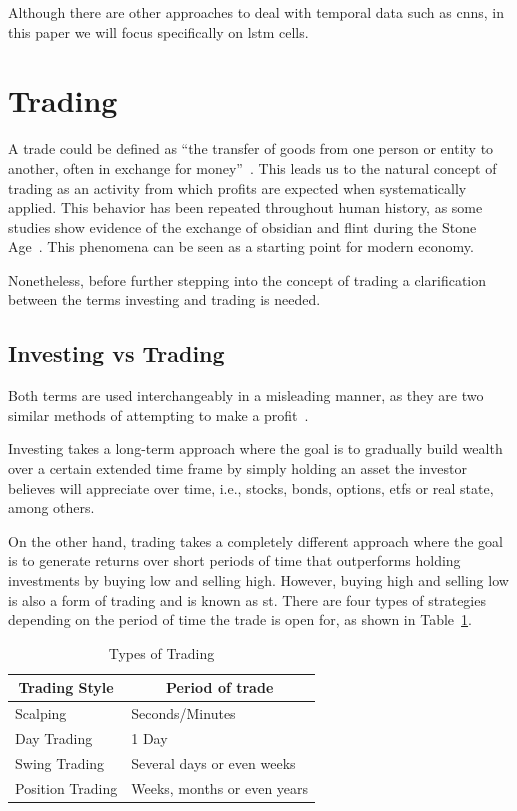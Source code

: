 Although there are other approaches to deal with temporal data such as \glspl{cnn}, in this paper we will focus specifically on \gls{lstm} cells.

\section{Trading}

A trade could be defined as \enquote{the transfer of goods from one person or entity to another, often in exchange for money}~\cite{tradeDefinition}. This leads us to the natural concept of trading as an activity from which profits are expected when systematically applied. This behavior has been repeated throughout human history, as some studies show evidence of the exchange of obsidian and flint during the Stone Age~\cite{oxfordArcheology,obsidianTrade}. This phenomena can be seen as a starting point for modern economy.

Nonetheless, before further stepping into the concept of trading a clarification between the terms investing and trading is needed.

\subsection{Investing vs Trading}

Both terms are used interchangeably in a misleading manner, as they are two similar methods of attempting to make a profit~\cite{investingVsTrading}.

Investing takes a long-term approach where the goal is to gradually build wealth over a certain extended time frame by simply holding an asset the investor believes will appreciate over time, i.e., stocks, bonds, options, \glspl{etf} or real state, among others.

On the other hand, trading takes a completely different approach where the goal is to generate returns over short periods of time that outperforms holding investments by buying low and selling high. However, buying high and selling low is also a form of trading and is known as \gls{st}. There are four types of strategies depending on the period of time the trade is open for, as shown in Table~\ref{tab:types-trading}.

\begin{table}[h]
\caption{\label{tab:types-trading} Types of Trading}
\centering
\begin{tabular}{@{}|l|l|@{}}
    \toprule
    \multicolumn{1}{|c|}{\textbf{Trading Style}} & \multicolumn{1}{c|}{\textbf{Period of trade}} \\ \midrule
        Scalping         & Seconds/Minutes             \\
        Day Trading      & 1 Day                       \\
        Swing Trading    & Several days or even weeks  \\
        Position Trading & Weeks, months or even years \\ \bottomrule
\end{tabular}
\end{table}


